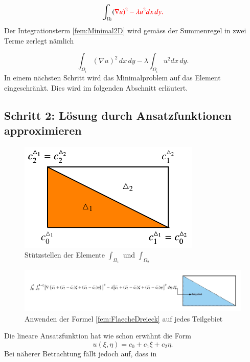 \begin{equation}
\int_{\Omega_i} (\color{red}{\nabla} u)^2 - \lambda u^2 dx \, dy.
\label{fem:Minimal2D}
\end{equation}
Der Integrationsterm \eqref{fem:Minimal2D} wird gemäss der Summenregel in zwei Terme zerlegt nämlich 

\begin{equation}
\int_{\Omega_i} (\nabla u)^2 \, dx \, dy - \lambda \int_{\Omega_i} u^2 dx \, dy.
\label{fem:Minimal2D2Term}
\end{equation}
In einem nächsten Schritt wird das Minimalproblem auf das Element eingeschränkt.
Dies wird im folgenden Abschnitt erläutert.

\subsection{Schritt 2: Lösung durch Ansatzfunktionen approximieren}
\begin{figure}
\centering
\includegraphics{papers/fem/Images/bild4711.pdf}
\caption{Stützstellen der Elemente $\int_{\Omega_1}$ und $\int_{\Omega_2}$ }
\label{fem:Stuestellen}
\end{figure} 
\begin{figure}
\centering
\includegraphics[scale=0.6]{papers/fem/Images/FoTeilgebiet.jpeg}
\caption{Anwenden der Formel \eqref{fem:FlaecheDreieck} auf jedes Teilgebiet}
\label{fig:schemNMR_vorlage}
\end{figure}
Die lineare Ansatzfunktion hat wie schon erwähnt die Form
\begin{equation}
u(\xi, \eta) = c_0 + c_1 \xi + c_2 \eta.
\label{fem:equationSchwarzLinear}
\end{equation}
Bei näherer Betrachtung fällt jedoch auf, dass in
